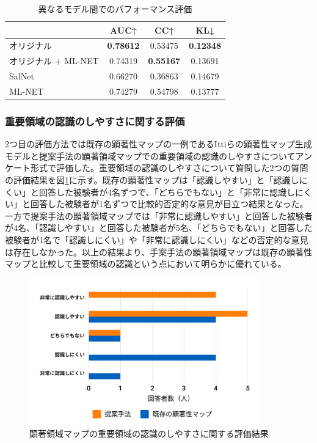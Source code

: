 \begin{table}[h]
  \caption{異なるモデル間でのパフォーマンス評価}
  \label{table:model-perfomance}
  \centering
  \begingroup
  \renewcommand{\arraystretch}{1.2} %
  \small
   \begin{tabular}{lccc}
    \hline
    & AUC↑ & CC↑ & KL↓ \\
    \hline \hline
    オリジナル & {\bf 0.78612} & 0.53475 & {\bf 0.12348} \\
    オリジナル + ML-NET & 0.74319 & {\bf 0.55167} & 0.13691 \\
    SalNet & 0.66270 & 0.36863 & 0.14679 \\
    ML-NET & 0.74279 & 0.54798 & 0.13777 \\
    \hline
  \end{tabular}
  \endgroup
\end{table}


\subsubsection{重要領域の認識のしやすさに関する評価}
\par 2つ目の評価方法では既存の顕著性マップの一例であるIttiらの顕著性マップ生成モデルと提案手法の顕著領域マップでの重要領域の認識のしやすさについてアンケート形式で評価した。重要領域の認識のしやすさについて質問した2つの質問の評価結果を図\ref{fig_evaluation02-1}に示す。既存の顕著性マップは「認識しやすい」と「認識しにくい」と回答した被験者が4名ずつで、「どちらでもない」と「非常に認識しにくい」と回答した被験者が1名ずつで比較的否定的な意見が目立つ結果となった。一方で提案手法の顕著領域マップでは「非常に認識しやすい」と回答した被験者が4名、「認識しやすい」と回答した被験者が5名、「どちらでもない」と回答した被験者が1名で「認識しにくい」や「非常に認識しにくい」などの否定的な意見は存在しなかった。以上の結果より、手案手法の顕著領域マップは既存の顕著性マップと比較して重要領域の認識という点において明らかに優れている。

\begin{figure}[H]
  \centering
  \includegraphics[width=10cm]{figures/07_result01.jpg}
  \caption{顕著領域マップの重要領域の認識のしやすさに関する評価結果}
  \label{fig_evaluation02-1}
\end{figure}

